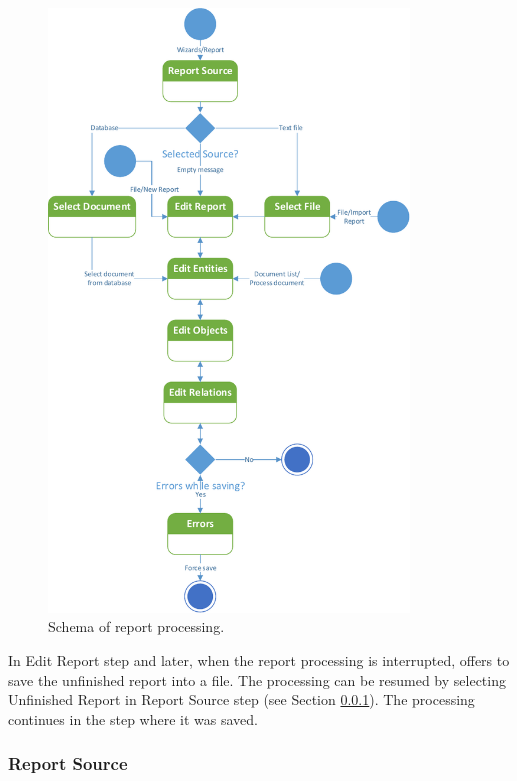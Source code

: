 \begin{figure}[!htb]
        \centering
        \includegraphics[height=16cm,keepaspectratio]{Images/pipeline}
        \caption{Schema of report processing.}
        \label{fig:Pipeline}
\end{figure}

In Edit Report step and later, when the report processing is interrupted,
\textan{} offers to save the unfinished report into a file. The processing can
be resumed by selecting Unfinished Report in Report Source step (see Section
\ref{sssec:ReportSource}). The processing continues in the step where it was
saved.

\subsubsection{Report Source}
\label{sssec:ReportSource}

